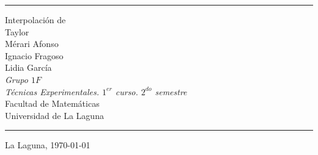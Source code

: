 \documentclass[spanish,a4paper,11pt,twoside]{report}
\begin{document}


\pagestyle{empty}
\thispagestyle{empty}


\newcommand{\HRule}{\rule{\linewidth}{1mm}}
\setlength{\parindent}{0mm}
\setlength{\parskip}{0mm}



\HRule
\begin{center}
        {\Huge Interpolación de} \\[2.5mm] 
        {\Huge Taylor} \\[2.5mm]
        {\Large  Mérari Afonso \\ Ignacio Fragoso \\ Lidia García} \\[5mm]
        {\Large \textit{Grupo $1F$ }} \\[5mm]


        {\em Técnicas Experimentales. $1^{er}$ curso. $2^{do}$ semestre} \\[5mm]
        
        Facultad de Matemáticas \\[5mm]
        
        Universidad de La Laguna \\
\end{center}
\HRule
{}
\begin{center}
  La Laguna, \today 
\end{center}



\newpage{\pagestyle{empty}\cleardoublepage}

\pagestyle{myheadings} 


\pagestyle{plain}
\setcounter{page}{1}


\tableofcontents

\newpage{\pagestyle{empty}\cleardoublepage} %
\listoffigures
\end{document}
